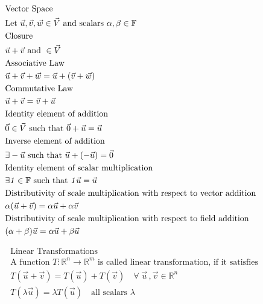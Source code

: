 \documentclass{book}
\begin{document}
\pagebreak
\begin{align*}
    & \mbox{Vector Space} \\
    & \noindent \text{Let }\vec{u}, \vec{v}, \vec{w} \in \vec{V} \text{ and scalars } \alpha, \beta \in \mathbb{F} \\
    & \mbox{Closure} \\ 
    & \vec{u} + \vec{v} \text{ and } \in \vec{V} \\
    & \mbox{Associative Law} \\
    & \vec{u} + \vec{v} + \vec{w} = \vec{u} + (\vec{v} + \vec{w}) \\
    & \mbox{Commutative Law} \\
    & \vec{u} + \vec{v} = \vec{v} + \vec{u}  \\
    & \mbox{Identity element of addition}\\
    & \vec{0} \in \vec{V} \text{ such that } \vec{0} + \vec{u} = \vec{u}\\
    & \mbox{Inverse element of addition}\\
    & \exists -\vec{u} \text{ such that } \vec{u} + (-\vec{u}) = \vec{0}\\
    & \mbox{Identity element of scalar multiplication}\\
    & \exists \mathit{1} \in \mathbb{F} \text{ such that } \mathit{1}\vec{u} = \vec{u}\\
    & \mbox{Distributivity of scale multiplication with respect to vector addition}\\
    & \alpha(\vec{u} + \vec{v}) = \alpha\vec{u} + \alpha\vec{v}\\
    & \mbox{Distributivity of scale multiplication with respect to field addition}\\
    & (\alpha + \beta)\vec{u} = \alpha\vec{u} + \beta\vec{u}\\
\end{align*}

\pagebreak
\begin{align*}
    & \mbox{Linear Transformations} \\
    & \mbox{A function } \mathit{T}: \mathbb{R}^n \rightarrow \mathbb{R}^m \mbox{ is called linear transformation, if it satisfies} \\
    & \mathit{T} ( \vec{u} + \vec{v} ) = \mathit{T}(\vec{u}) + \mathit{T}(\vec{v}) \quad \forall \; \vec{u} \,, \vec{v} \in \mathbb{R}^n\\
    & \mathit{T} ( \lambda \vec{u} ) = \lambda \mathit{T}(\vec{u}) \quad \mbox{all scalars } \lambda \\
\end{align*}
\end{document}

